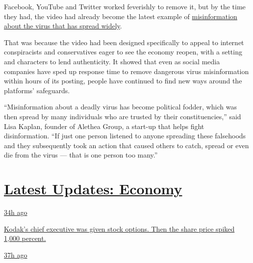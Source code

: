 Facebook, YouTube and Twitter worked feverishly to remove it, but by the
time they had, the video had already become the latest example of
\href{https://www.nytimes.com/2020/05/20/technology/plandemic-movie-youtube-facebook-coronavirus.html}{misinformation
about the virus that has spread widely}.

That was because the video had been designed specifically to appeal to
internet conspiracists and conservatives eager to see the economy
reopen, with a setting and characters to lend authenticity. It showed
that even as social media companies have sped up response time to remove
dangerous virus misinformation within hours of its posting, people have
continued to find new ways around the platforms' safeguards.

``Misinformation about a deadly virus has become political fodder, which
was then spread by many individuals who are trusted by their
constituencies,'' said Lisa Kaplan, founder of Alethea Group, a start-up
that helps fight disinformation. ``If just one person listened to anyone
spreading these falsehoods and they subsequently took an action that
caused others to catch, spread or even die from the virus --- that is
one person too many.''

\hypertarget{latest-updates-economy}{%
\section{\texorpdfstring{\href{https://www.nytimes.com/live/2020/07/31/business/stock-market-today-coronavirus?action=click\&pgtype=Article\&state=default\&region=MAIN_CONTENT_1\&context=storylines_live_updates}{Latest
Updates:
Economy}}{Latest Updates: Economy}}\label{latest-updates-economy}}

\href{https://www.nytimes.com/live/2020/07/31/business/stock-market-today-coronavirus?action=click\&pgtype=Article\&state=default\&region=MAIN_CONTENT_1\&context=storylines_live_updates\#kodaks-chief-executive-was-given-stock-options-then-the-share-price-spiked-1000-percent}{34h
ago}

\href{https://www.nytimes.com/live/2020/07/31/business/stock-market-today-coronavirus?action=click\&pgtype=Article\&state=default\&region=MAIN_CONTENT_1\&context=storylines_live_updates\#kodaks-chief-executive-was-given-stock-options-then-the-share-price-spiked-1000-percent}{Kodak's
chief executive was given stock options. Then the share price spiked
1,000 percent.}

\href{https://www.nytimes.com/live/2020/07/31/business/stock-market-today-coronavirus?action=click\&pgtype=Article\&state=default\&region=MAIN_CONTENT_1\&context=storylines_live_updates\#fitch-ratings-downgrades-its-outlook-on-us-debt}{37h
ago}

